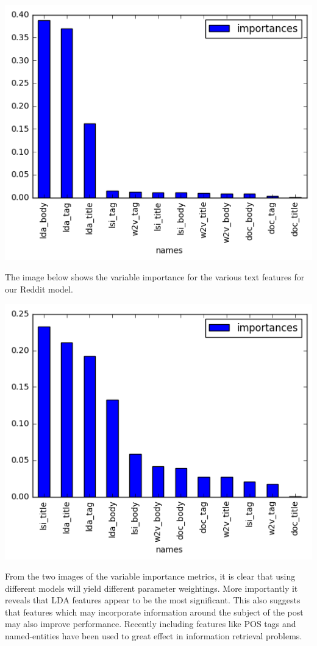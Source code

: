 \documentclass[journal]{IEEEtran}
\begin{document}
\includegraphics[width=\textwidth]{so_varimp.png}

The image below shows the variable importance for the various text features for our Reddit model.

\includegraphics[width=\textwidth]{reddit_varimp.png}

From the two images of the variable importance metrics, it is clear that using different models will yield different parameter weightings. More importantly it reveals that LDA features appear to be the most significant. This also suggests that features which may incorporate information around the subject of the post may also improve performance. Recently including features like POS tags and named-entities have been used to great effect in information retrieval problems\cite{featurerich}.
\end{document}
